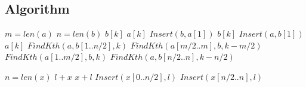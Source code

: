 \documentclass{article}
\begin{document}
    \subsection*{Algorithm}
        \begin{algorithm}[H]
            \begin{algorithmic}
                    \State $m = len(a)$
                    \State $n = len(b)$
                        \State \Return $b[k]$
                    \EndIf
                        \State \Return $a[k]$
                    \EndIf
                        \State $Insert(b, a[1])$
                        \State \Return $b[k]$
                    \EndIf
                        \State $Insert(a, b[1])$
                        \State \Return $a[k]$
                    \EndIf
                            \State $FindKth(a, b[1..n/2], k)$
                        \Else
                            \State $FindKth(a[m/2..m], b, k-m/2)$
                        \EndIf
                    \Else
                            \State $FindKth(a[1..m/2], b, k)$
                        \Else
                            \State $FindKth(a, b[n/2..n], k-n/2)$
                        \EndIf
                    \EndIf
                \EndProcedure

                    \State $n = len(x)$
                            \State \Return $l + x$
                        \Else
                            \State \Return $x + l$
                        \EndIf
                    \EndIf
                        \State $Insert(x[0..n/2], l)$
                    \Else
                        \State $Insert(x[n/2..n], l)$
                    \EndIf
                \EndProcedure
            \end{algorithmic}
        \end{algorithm}
\end{document}
